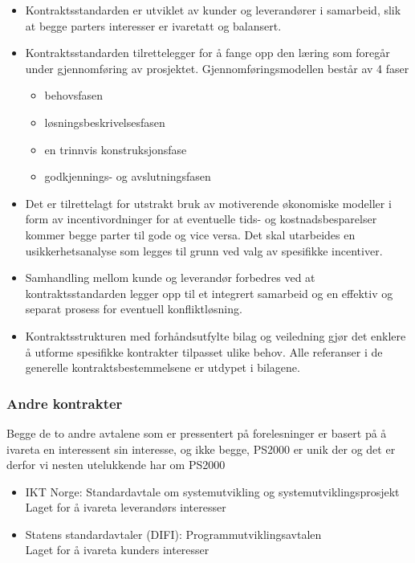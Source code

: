 \documentclass[11pt]{article}
\begin{document}
\begin{itemize}
\item Kontraktsstandarden er utviklet av kunder og leverandører i samarbeid, 
     slik at begge parters interesser er ivaretatt og balansert.
\item Kontraktsstandarden tilrettelegger for å fange opp den læring som foregår under gjennomføring av prosjektet. 
     Gjennomføringsmodellen består av 4 faser

\begin{itemize}
\item behovsfasen
\item løsningsbeskrivelsesfasen
\item en trinnvis konstruksjonsfase
\item godkjennings- og avslutningsfasen
\end{itemize}

\item Det er tilrettelagt for utstrakt bruk av motiverende økonomiske modeller i form av incentivordninger
     for at eventuelle tids- og kostnadsbesparelser kommer begge parter til gode og vice versa. 
     Det skal utarbeides en usikkerhetsanalyse som legges til grunn ved valg av spesifikke incentiver.
\item Samhandling mellom kunde og leverandør forbedres 
     ved at kontraktsstandarden legger opp til et integrert samarbeid 
     og en effektiv og separat prosess for eventuell konfliktløsning.
\item Kontraktsstrukturen med forhåndsutfylte bilag og veiledning gjør det enklere å utforme spesifikke kontrakter tilpasset ulike behov. 
     Alle referanser i de generelle kontraktsbestemmelsene er utdypet i bilagene.
\end{itemize}
\subsubsection{Andre kontrakter}
\label{sec-11.3.1}

    
    Begge de to andre avtalene som er pressentert på forelesninger er basert
    på å ivareta en interessent sin interesse, og ikke begge, PS2000 er unik der
    og det er derfor vi nesten utelukkende har om PS2000
\begin{itemize}

\item IKT Norge: Standardavtale om systemutvikling og systemutviklingsprosjekt\\
\label{sec-11.3.1.1}%
Laget for å ivareta leverandørs interesser

\item Statens standardavtaler (DIFI): Programmutviklingsavtalen\\
\label{sec-11.3.1.2}%
Laget for å ivareta kunders interesser

\end{itemize} %
\end{document}

